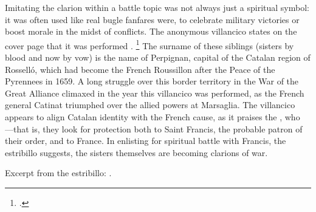 Imitating the clarion within a battle topic was not always just a spiritual
symbol: it was often used like real bugle fanfares were, to celebrate military
victories or boost morale in the midst of conflicts.%
    \Autocite[288--294]{Illari:Polychoral}
The anonymous villancico  states on the cover
page that it was performed .%
    \footnote{.}
The surname of these siblings (sisters by blood and now by vow) is the name of
Perpignan, capital of the Catalan region of Rosselló, which had become the
French Roussillon after the Peace of the Pyrennees in 1659.
A long struggle over this border territory in the War of the Great Alliance
climaxed in the year this villancico was performed, as the French general
Catinat triumphed over the allied powers at Marsaglia.
The villancico appears to align Catalan identity with the French cause, as it
praises the , who
---that is,
they look for protection both to Saint Francis, the probable patron of their
order, and to France.
In enlisting for spiritual battle with Francis, the estribillo suggests, the
sisters themselves are becoming clarions of war.%
\begin{Footnote}
    Excerpt from the estribillo: 
    .
\end{Footnote}


